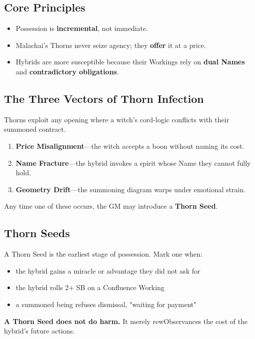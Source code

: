\documentclass[11pt]{book}
\begin{document}
\subsection*{Core Principles}
\begin{itemize}[leftmargin=1.5em]
    \item Possession is \textbf{incremental}, not immediate.
    \item Malachai's Thorns never seize agency; they \textbf{offer} it at a price.
    \item Hybrids are more susceptible because their Workings rely on 
          \textbf{dual Names} and \textbf{contradictory obligations}.
\end{itemize}

\subsection*{The Three Vectors of Thorn Infection}
Thorns exploit any opening where a witch's cord-logic conflicts with their
summoned contract.

\begin{enumerate}[leftmargin=1.8em]
    \item \textbf{Price Misalignment}---the witch accepts a boon without naming its cost.
    \item \textbf{Name Fracture}---the hybrid invokes a spirit whose Name they cannot fully hold.
    \item \textbf{Geometry Drift}---the summoning diagram warps under emotional strain.
\end{enumerate}

Any time one of these occurs, the GM may introduce a \textbf{Thorn Seed}.

\subsection*{Thorn Seeds}
A Thorn Seed is the earliest stage of possession. Mark one when:
\begin{itemize}[leftmargin=1.5em]
    \item the hybrid gains a miracle or advantage they did not ask for  
    \item the hybrid rolls 2+ SB on a Confluence Working  
    \item a summoned being refuses dismissal, "waiting for payment"
\end{itemize}

\textbf{A Thorn Seed does not do harm.}  
It merely rewObservances the cost of the hybrid's future actions.
\end{document}
